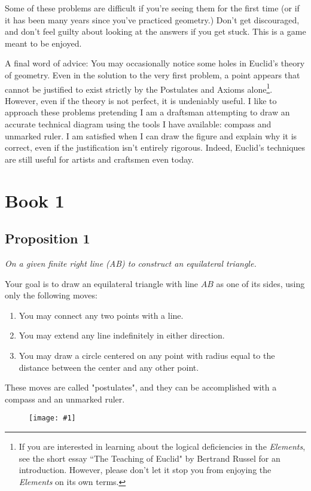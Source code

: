 \documentclass[openany]{book}
\newcommand{\diagram}[1]{
    \vspace*{\fill}
    \begin{figure}[H]
        \centering
        \texttt{[image: \#1]}
    \end{figure}
    \vspace*{\fill}
}
\newenvironment{proposition}
    {\begin{center}\em}
    {\end{center}}
\begin{document}
    Some of these problems are difficult if you're seeing them for the first time (or if it has been many years since you've practiced geometry.) Don't get discouraged, and don't feel guilty about looking at the answers if you get stuck. This is a game meant to be enjoyed.

    A final word of advice: You may occasionally notice some holes in Euclid's theory of geometry. Even in the solution to the very first problem, a point appears that cannot be justified to exist strictly by the Postulates and Axioms alone\footnote{If you are interested in learning about the logical deficiencies in the \textit{Elements}, see the short essay ``The Teaching of Euclid" by Bertrand Russel for an introduction. However, please don't let it stop you from enjoying the \textit{Elements} on its own terms.}. However, even if the theory is not perfect, it is undeniably useful. I like to approach these problems pretending I am a draftsman attempting to draw an accurate technical diagram using the tools I have available: compass and unmarked ruler. I am satisfied when I can draw the figure and explain why it is correct, even if the justification isn't entirely rigorous. Indeed, Euclid's techniques are still useful for artists and craftsmen even today.

    \renewcommand{\chaptermark}[1]{\markboth{#1}{}}
    \renewcommand{\sectionmark}[1]{\markright{#1}}

    \chapter{Book 1}

    \section{Proposition 1}
    \begin{proposition}
        On a given finite right line (AB) to construct an equilateral triangle.
    \end{proposition}

    Your goal is to draw an equilateral triangle with line $AB$ as one of its sides, using only the following moves:
    \begin{enumerate}
        \item You may connect any two points with a line.
        \item You may extend any line indefinitely in either direction.
        \item You may draw a circle centered on any point with radius equal to the distance between the center and any other point.
    \end{enumerate}
    These moves are called "postulates", and they can be accomplished with a compass and an unmarked ruler.
    \diagram{prop1.pdf}
\end{document}
